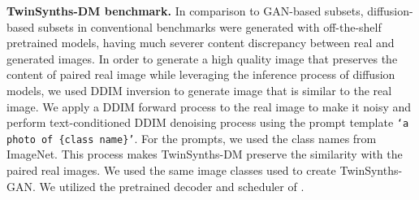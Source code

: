 \textbf{TwinSynths-DM benchmark.} 
In comparison to GAN-based subsets, diffusion-based subsets in conventional benchmarks were generated with off-the-shelf pretrained models, having much severer content discrepancy between real and generated images.
In order to generate a high quality image that preserves the content of paired real image while leveraging the inference process of diffusion models, we used DDIM inversion\cite{songdenoising} to generate image that is similar to the real image.
We apply a DDIM forward process to the real image to make it noisy and perform text-conditioned DDIM denoising process using the prompt template \texttt{`a photo of  \{class name\}'}. 
For the prompts, we used the class names from ImageNet.
This process makes TwinSynths-DM preserve the similarity with the paired real images. 
We used the same image classes used to create TwinSynths-GAN. 
We utilized the pretrained decoder and scheduler of \cite{songdenoising}.
